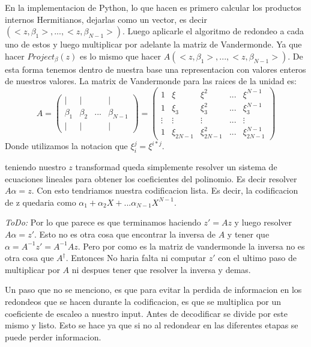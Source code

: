 \documentclass[12pt, oneside]{article}
\begin{document}
En la implementacion de Python, lo que hacen es primero calcular los productos internos
Hermitianos, dejarlas como un vector, es decir $(<z,\beta_1>,...,<z,\beta_{N-1}>)$.
Luego aplicarle el algoritmo de redondeo a cada uno de estos y luego multiplicar por adelante la matriz
de Vandermonde.
Ya que hacer $ Project_{\beta}(z) $ es lo mismo que hacer $A(<z,\beta_1>,...,<z,\beta_{N-1}>)$.
De esta forma tenemos dentro de nuestra base una representacion con valores enteros de nuestros
valores.
La matrix de Vandermonde para las raices de la unidad es:
\begin{equation*}
    A=    \begin{pmatrix}
        | & | &    & | \\
        \beta_1 & \beta_2 & ... & \beta_{N-1}\\
        | & | &    & |
    \end{pmatrix}
    =
    \begin{pmatrix}
        1 & \xi &  \xi^2 & ... & \xi^{N-1} \\
        1 & \xi_3 & \xi_3^2 & ... & \xi_3^{N-1}\\
        \vdots & \vdots & \vdots & ... & \vdots\\
        1 & \xi_{2N-1} & \xi_{2N-1}^2 & ... & \xi_{2N-1}^{N-1}
    \end{pmatrix}
    \label{eq:vandermonde}
\end{equation*}
Donde utilizamos la notacion que $\xi_i^j=\xi^{i*j}$.

teniendo nuestro $z$ transformad queda simplemente resolver un sistema de ecuaciones lineales para
obtener los coeficientes del polinomio.
Es decir resolver $A\alpha=z$.
Con esto tendriamos nuestra codificacion lista.
Es decir, la codificacion de z quedaria como $\alpha_1 + \alpha_2 X + ... \alpha_{N-1}X^{N-1}$.

\textit{ToDo:} Por lo que parece es que terminamos haciendo $z'=Az$ y luego resolver
$A\alpha=z'$.
Esto no es otra cosa que encontrar la inversa de $A$ y tener que $\alpha=A^{-1}z'=A^{-1}Az$.
Pero por como es la matriz de vandermonde la inversa no es otra cosa que $A^\dagger$.
Entonces No haria falta ni computar $z'$ con el ultimo paso de multiplicar por $A$ ni despues
tener que resolver la inversa y demas.

Un paso que no se menciono, es que para evitar la perdida de informacion en los redondeos
que se hacen durante la codificacion, es que se multiplica por un coeficiente de
escaleo a nuestro input.
Antes de decodificar se divide por este mismo y listo.
Esto se hace ya que si no al redondear en las diferentes etapas se puede perder informacion.
\end{document}
